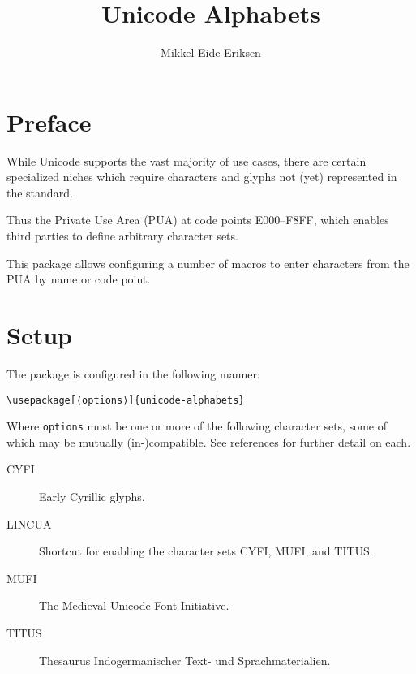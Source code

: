 \documentclass{article}
\title{Unicode Alphabets}
\author{Mikkel Eide Eriksen}
\begin{document}
\maketitle

\section{Preface}

While Unicode supports the vast majority of use cases, there are certain specialized niches which require characters and glyphs not (yet) represented in the standard.

Thus the Private Use Area (PUA) at code points E000--F8FF, which enables third parties to define arbitrary character sets.

This package allows configuring a number of macros to enter characters from the PUA by name or code point.

\section{Setup}

The package is configured in the following manner:

\begin{verbatim}
\usepackage[⟨options⟩]{unicode-alphabets}
\end{verbatim}

Where \verb|options| must be one or more of the following character sets, some of which may be mutually (in-)compatible. See references for further detail on each.

\begin{description}

\item[CYFI\cite{CYFI}] Early Cyrillic glyphs.
\item[LINCUA\cite{LINCUA}] Shortcut for enabling the character sets CYFI, MUFI, and TITUS.
\item[MUFI\cite{MUFI}] The Medieval Unicode Font Initiative.
\item[TITUS\cite{TITUS}] Thesaurus Indogermanischer Text- und Sprachmaterialien.

\end{description}
\end{document}
